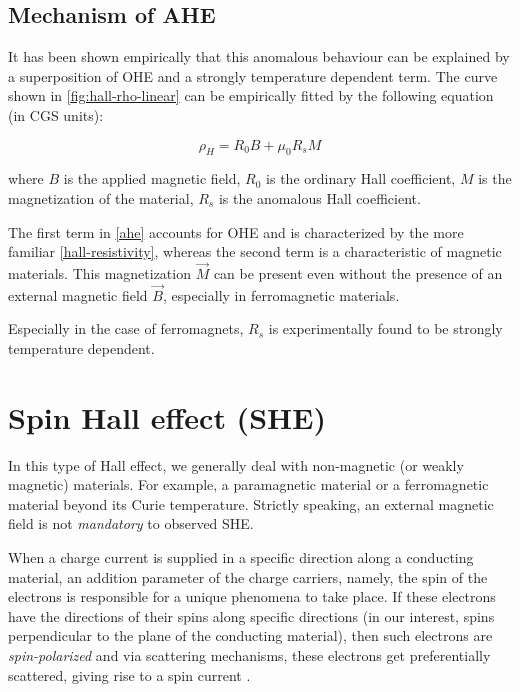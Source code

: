 \subsection{Mechanism of AHE}

It has been shown empirically that this anomalous behaviour can be explained by a superposition of OHE and a strongly temperature dependent term.
The curve shown in \cref{fig:hall-rho-linear}
can be empirically fitted by the following equation (in CGS units):

\begin{equation} \label{ahe}
    \rho_H = R_0 B + \mu_0 R_s M
\end{equation}

where $ B $ is the applied magnetic field, $ R_0 $ is the ordinary Hall coefficient, $ M $ is the magnetization of the material, $ R_s $ is the anomalous Hall coefficient.

The first term in \cref{ahe} accounts for OHE and is characterized by the more familiar \cref{hall-resistivity}, whereas the second term is a characteristic of magnetic materials.
This magnetization $ \vec{M} $ can be present even without the presence of an external magnetic field $ \vec{B} $, especially in ferromagnetic materials.

Especially in the case of ferromagnets, $ R_s $ is experimentally found to be strongly temperature dependent.














\section{Spin Hall effect (SHE)}

In this type of Hall effect, we generally deal with non-magnetic (or weakly magnetic) materials.
For example, a paramagnetic material or a ferromagnetic material beyond its Curie temperature.
Strictly speaking, an external magnetic field is not \textit{mandatory} to observed SHE.

When a charge current is supplied in a specific direction along a conducting material, an addition parameter of the charge carriers, namely, the spin of the electrons is responsible for a unique phenomena to take place.
If these electrons have the directions of their spins along specific directions (in our interest, spins perpendicular to the plane of the conducting material), then such electrons are \textit{spin-polarized} and via scattering mechanisms\footnotemark, these electrons get preferentially scattered, giving rise to a spin current \cite{dyakonov1971current,hirsch1999spin}.

